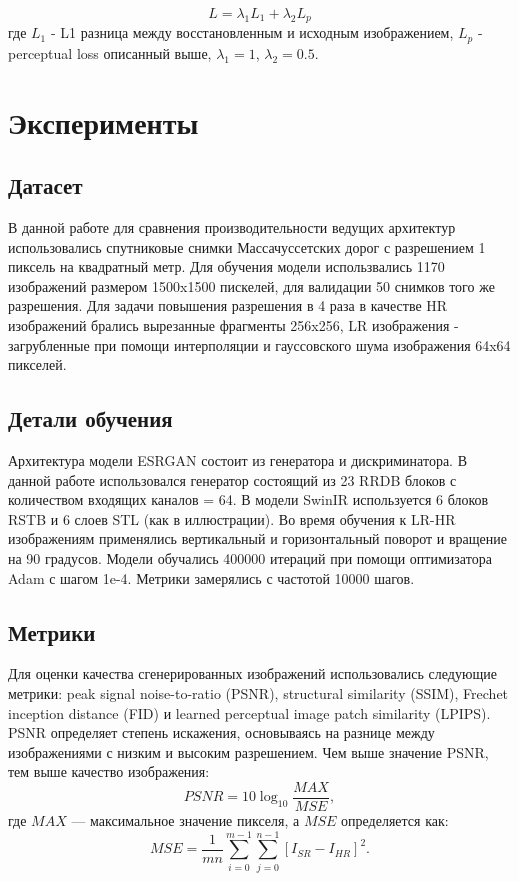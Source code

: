 \documentclass[14pt]{extarticle}
\begin{document}
$$
    L = \lambda_1 L_1 + \lambda_2 L_p
$$
где $L_1$ - L1 разница между восстановленным и исходным изображением, $L_p$ - perceptual loss описанный выше, $\lambda_1=1$, $\lambda_2=0.5$.

\section{Эксперименты}

\subsection{Датасет}

В данной работе для сравнения производительности ведущих архитектур использовались спутниковые снимки Массачуссетских дорог \cite{MnihThesis} с разрешением 1 пиксель на квадратный метр. Для обучения модели использвались 1170 изображений размером 1500x1500 пискелей, для валидации 50 снимков того же разрешения. Для задачи повышения разрешения в 4 раза в качестве HR изображений брались вырезанные фрагменты 256x256, LR изображения - загрубленные при помощи интерполяции и гауссовского шума изображения 64x64 пикселей.

\subsection{Детали обучения}
Архитектура модели ESRGAN состоит из генератора и дискриминатора. В данной работе использовался генератор состоящий из 23 RRDB блоков с количеством входящих каналов = 64.
В модели SwinIR используется 6 блоков RSTB и 6 слоев STL (как в иллюстрации). Во время обучения к LR-HR изображениям применялись вертикальный и горизонтальный поворот и вращение на 90 градусов. Модели обучались 400000 итераций при помощи оптимизатора Adam с шагом 1e-4. Метрики замерялись с частотой 10000 шагов.

\subsection{Метрики}
Для оценки качества сгенерированных изображений использовались следующие метрики: peak signal noise-to-ratio (PSNR), structural similarity (SSIM), Frechet inception distance (FID) и learned perceptual image patch similarity (LPIPS). PSNR определяет степень искажения, основываясь на разнице между изображениями с низким и высоким разрешением. Чем выше значение PSNR, тем выше качество изображения:
$$
    PSNR = 10 \log_{10} \frac{MAX}{MSE},
$$
где $MAX$ — максимальное значение пикселя, а $MSE$ определяется как:
$$
    MSE = \frac{1}{mn} \sum_{i=0}^{m-1} \sum_{j=0}^{n-1} [I_{SR} - I_{HR}]^2.
$$
\end{document}

